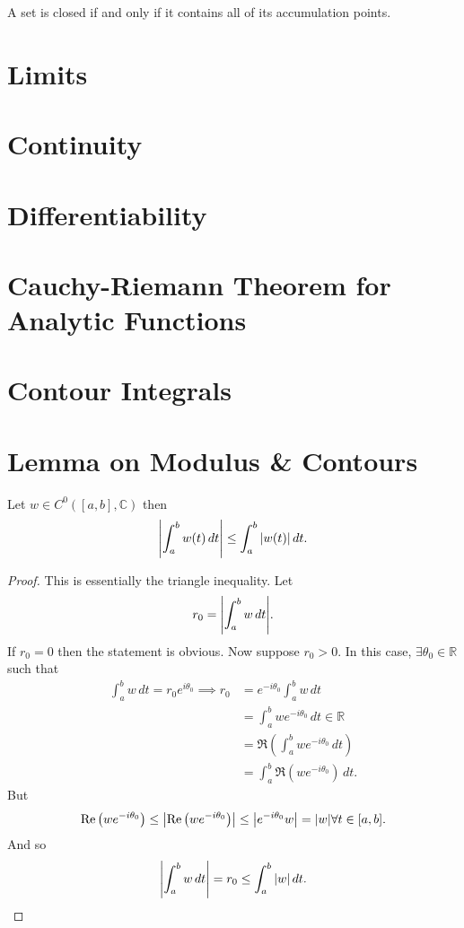 \documentclass{article}
\theoremstyle{definition}
\newcommand{\R}{\mathbb{R}}
\newcommand{\C}{\mathbb{C}}
\newcommand{\lp}{\left(}
\newcommand{\rp}{\right)}
\newcommand{\nn}{\nonumber}
\begin{document}
\noindent A set is closed if and only if it contains all of its accumulation points.




\section{Limits}
\section{Continuity}
\section{Differentiability}
\section{Cauchy-Riemann Theorem for Analytic Functions}

\section{Contour Integrals}



\section{Lemma on Modulus \& Contours}

Let $w \in C^0([a,b], \C)$ then 
\begin{align}
\abs{\int^b_aw(t)\,dt} \leq \int^b_a \abs{w(t)}\,dt.
\end{align}

\begin{proof}
	This is essentially the triangle inequality. Let
	\begin{align}
	r_0 = \abs{\int^b_a w\,dt}.
	\end{align}
	If $r_0 = 0$ then the statement is obvious. Now suppose $r_0 > 0$. In this case, $\exists \theta_0 \in \R$ such that 
	\begin{align}
	\int^b_a w\,dt = r_0 e^{i\theta_0} \implies r_0 &= e^{-i\theta_0}\int^b_a w\,dt\nn\\
	&= \int^b_a we^{-i\theta_0}\,dt \in\R\nn\\
	&= \Re\lp  \int^b_a we^{-i\theta_0}\,dt  \rp\nn\\
	&= \int^b_a \Re\lp we^{-i\theta_0} \rp\,dt.
	\end{align}
	But 
	\begin{align}
	\Re\lp we^{-i\theta_0} \rp \leq \abs{\Re\lp we^{-i\theta_0} \rp} \leq \abs{e^{-i\theta_0}w} = \abs{w} \forall t \in [a,b].
	\end{align}
	And so
	\begin{align}
	\abs{\int^b_a w\,dt} = r_0 \leq \int^b_a \abs{w}\,dt.
	\end{align}
\end{proof}
\end{document}
